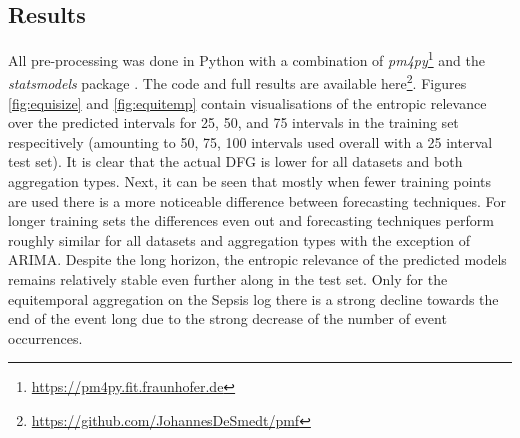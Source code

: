 
\subsection{Results}
All pre-processing was done in Python with a combination of \emph{pm4py}\footnote{\url{https://pm4py.fit.fraunhofer.de}} and the \emph{statsmodels} package \cite{seabold2010statsmodels}. 
The code and full results are available here\footnote{\url{https://github.com/JohannesDeSmedt/pmf}}.
Figures \ref{fig:equisize} and \ref{fig:equitemp} contain visualisations of the entropic relevance over the predicted intervals for 25, 50, and 75 intervals in the training set respecitively (amounting to 50, 75, 100 intervals used overall with a 25 interval test set). 
It is clear that the actual DFG is lower for all datasets and both aggregation types.
Next, it can be seen that mostly when fewer training points are used there is a more noticeable difference between forecasting techniques.
For longer training sets the differences even out and forecasting techniques perform roughly similar for all datasets and aggregation types with the exception of ARIMA.
Despite the long horizon, the entropic relevance of the predicted models remains relatively stable even further along in the test set.
Only for the equitemporal aggregation on the Sepsis log there is a strong decline towards the end of the event long due to the strong decrease of the number of event occurrences.


